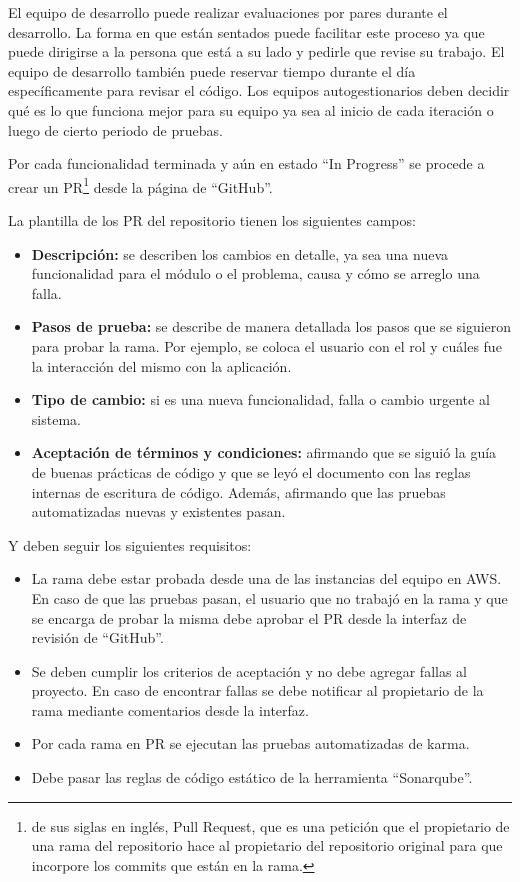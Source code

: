 El equipo de desarrollo puede realizar evaluaciones por pares durante el desarrollo. La forma en que están sentados puede facilitar este proceso ya que puede dirigirse a la persona que está a su lado y pedirle que revise su trabajo. El equipo de desarrollo también puede reservar tiempo durante el día específicamente para revisar el código. Los equipos autogestionarios deben decidir qué es lo que funciona mejor para su equipo ya sea al inicio de cada iteración o luego de cierto periodo de pruebas.

Por cada funcionalidad terminada y aún en estado \enquote{In Progress} se procede a crear un PR\footnote{de sus siglas en inglés, Pull Request, que es una petición que el propietario de una rama del repositorio hace al propietario del repositorio original para que incorpore los commits que están en la rama.} desde la página de \enquote{GitHub}. 

La plantilla de los PR del repositorio tienen los siguientes campos:
\begin{itemize}
	\item \textbf{Descripción:} se describen los cambios en detalle, ya sea una nueva funcionalidad para el módulo o el problema, causa y cómo se arreglo una falla.
	\item \textbf{Pasos de prueba:} se describe de manera detallada los pasos que se siguieron para probar la rama. Por ejemplo, se coloca el usuario con el rol y cuáles fue la interacción del mismo con la aplicación.
	\item \textbf{Tipo de cambio:} si es una nueva funcionalidad, falla o cambio urgente al sistema.
	\item \textbf{Aceptación de términos y condiciones:} afirmando que se siguió la guía de buenas prácticas de código y que se leyó el documento con las reglas internas de escritura de código. Además, afirmando que las pruebas automatizadas nuevas y existentes pasan.
\end{itemize}

Y deben seguir los siguientes requisitos:
\begin{itemize}
	\item La rama debe estar probada desde una de las instancias del equipo en AWS. En caso de que las pruebas pasan, el usuario que no trabajó en la rama y que se encarga de probar la misma debe aprobar el PR desde la interfaz de revisión de \enquote{GitHub}.
	\item Se deben cumplir los criterios de aceptación y no debe agregar fallas al proyecto. En caso de encontrar fallas se debe notificar al propietario de la rama mediante comentarios desde la interfaz.
	\item Por cada rama en PR se ejecutan las pruebas automatizadas de karma.
	\item Debe pasar las reglas de código estático de la herramienta \enquote{Sonarqube}.
\end{itemize}

